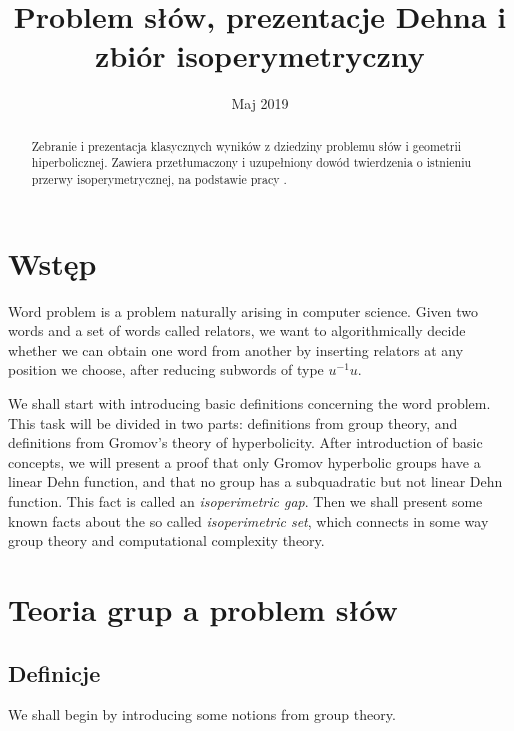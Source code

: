 \documentclass[licencjacka]{pracamgr}
\title{Problem słów, prezentacje Dehna i zbiór isoperymetryczny}
\date{Maj 2019}
\begin{document}
\maketitle

\begin{abstract}

Zebranie i prezentacja klasycznych wyników z dziedziny problemu słów i geometrii hiperbolicznej. Zawiera przetłumaczony i uzupełniony dowód twierdzenia o istnieniu przerwy isoperymetrycznej, na podstawie pracy \cite{bib:subquadratic_isoperimetric_inequality}.

\end{abstract}

\tableofcontents


\chapter*{Wstęp}

Word problem is a problem naturally arising in computer science. Given two words and a set of words called relators, we want to algorithmically decide whether we can obtain one word from another by inserting relators at any position we choose, after reducing subwords of type $u^{-1}u$.

We shall start with introducing basic definitions concerning the word problem. This task will be divided in two parts: definitions from group theory, and definitions from Gromov's theory of hyperbolicity. After introduction of basic concepts, we will present a proof that only Gromov hyperbolic groups have a linear Dehn function, and that no group has a subquadratic but not linear Dehn function. This fact is called an \textit{isoperimetric gap}. Then we shall present some known facts about the so called \textit{isoperimetric set}, which connects in some way group theory and computational complexity theory.

\chapter{Teoria grup a problem słów}\label{r:concepts}

\section{Definicje}

We shall begin by introducing some notions from group theory.
\end{document}

